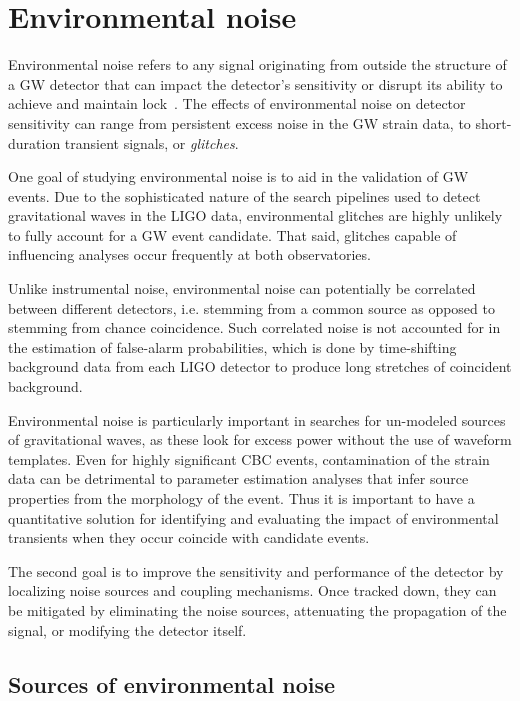 \chapter{Environmental noise}

Environmental noise refers to any signal originating from outside the structure of a \ac{GW} detector that can impact the detector's sensitivity or disrupt its ability to achieve and maintain lock~\citep{Effler2015,Nguyen2021}.
The effects of environmental noise on detector sensitivity can range from persistent excess noise in the \ac{GW} strain data, to short-duration transient signals, or \textit{glitches}.

One goal of studying environmental noise is to aid in the validation of \ac{GW} events.
Due to the sophisticated nature of the search pipelines used to detect gravitational waves in the \ac{LIGO} data, environmental glitches are highly unlikely to fully account for a \ac{GW} event candidate.
That said, glitches capable of influencing analyses occur frequently at both observatories.

Unlike instrumental noise, environmental noise can potentially be correlated between different detectors, i.e. stemming from a common source as opposed to stemming from chance coincidence.
Such correlated noise is not accounted for in the estimation of false-alarm probabilities, which is done by time-shifting background data from each \ac{LIGO} detector to produce long stretches of coincident background.

Environmental noise is particularly important in searches for un-modeled sources of gravitational waves, as these look for excess power without the use of waveform templates.
Even for highly significant \ac{CBC} events, contamination of the strain data can be detrimental to parameter estimation analyses that infer source properties from the morphology of the event.
Thus it is important to have a quantitative solution for identifying and evaluating the impact of environmental transients when they occur coincide with candidate events.

The second goal is to improve the sensitivity and performance of the detector by localizing noise sources and coupling mechanisms. Once tracked down, they can be mitigated by eliminating the noise sources, attenuating the propagation of the signal, or modifying the detector itself.

\section{Sources of environmental noise}

